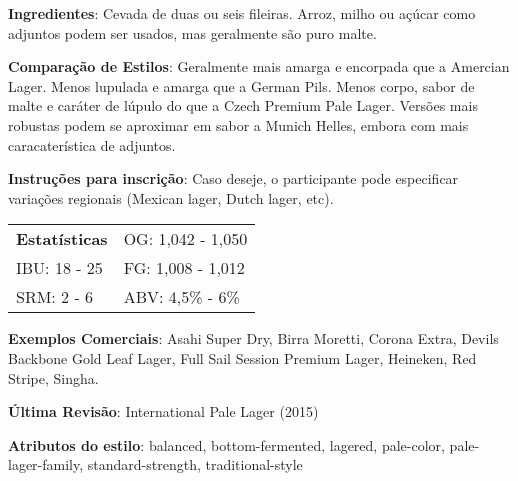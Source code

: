 \textbf{Ingredientes}: Cevada de duas ou seis fileiras. Arroz, milho ou açúcar como adjuntos podem ser usados, mas geralmente são puro malte.

\textbf{Comparação de Estilos}: Geralmente mais amarga e encorpada que a Amercian Lager. Menos lupulada e amarga que a German Pils. Menos corpo, sabor de malte e caráter de lúpulo do que a Czech Premium Pale Lager. Versões mais robustas podem se aproximar em sabor a Munich Helles, embora com mais caracaterística de adjuntos.

\textbf{Instruções para inscrição}: Caso deseje, o participante pode especificar variações regionais (Mexican lager, Dutch lager, etc).

\begin{tabular}{@{}p{35mm}p{35mm}@{}}
  \textbf{Estatísticas} & OG: 1,042 - 1,050 \\
  IBU: 18 - 25  & FG: 1,008 - 1,012  \\
  SRM: 2 - 6   & ABV: 4,5\% - 6\%
\end{tabular}

\textbf{Exemplos Comerciais}: Asahi Super Dry, Birra Moretti, Corona Extra, Devils Backbone Gold Leaf Lager, Full Sail Session Premium Lager, Heineken, Red Stripe, Singha.

\textbf{Última Revisão}: International Pale Lager (2015)

\textbf{Atributos do estilo}: balanced, bottom-fermented, lagered, pale-color, pale-lager-family, standard-strength, traditional-style

